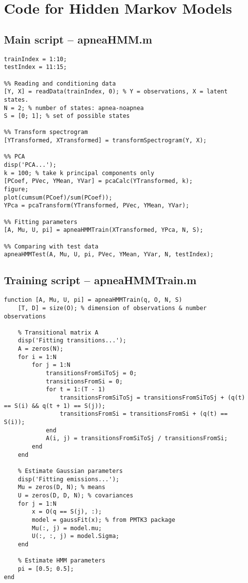 \chapter{Code for Hidden Markov Models}
\label{ch:HMMCode}

\section{Main script -- apneaHMM.m}
\label{sec:apneaHMM}
\begin{lstlisting}
trainIndex = 1:10;
testIndex = 11:15;

%% Reading and conditioning data
[Y, X] = readData(trainIndex, 0); % Y = observations, X = latent states.
N = 2; % number of states: apnea-noapnea
S = [0; 1]; % set of possible states

%% Transform spectrogram
[YTransformed, XTransformed] = transformSpectrogram(Y, X);

%% PCA
disp('PCA...');
k = 100; % take k principal components only
[PCoef, PVec, YMean, YVar] = pcaCalc(YTransformed, k);
figure;
plot(cumsum(PCoef)/sum(PCoef));
YPca = pcaTransform(YTransformed, PVec, YMean, YVar);

%% Fitting parameters
[A, Mu, U, pi] = apneaHMMTrain(XTransformed, YPca, N, S);

%% Comparing with test data
apneaHMMTest(A, Mu, U, pi, PVec, YMean, YVar, N, testIndex);
\end{lstlisting}

\section{Training script -- apneaHMMTrain.m}
\label{sec:apneaHMMTrain}
\begin{lstlisting}
function [A, Mu, U, pi] = apneaHMMTrain(q, O, N, S)
    [T, D] = size(O); % dimension of observations & number observations

    % Transitional matrix A
    disp('Fitting transitions...');
    A = zeros(N);
    for i = 1:N
        for j = 1:N
            transitionsFromSiToSj = 0;
            transitionsFromSi = 0;
            for t = 1:(T - 1)
                transitionsFromSiToSj = transitionsFromSiToSj + (q(t) == S(i) && q(t + 1) == S(j));
                transitionsFromSi = transitionsFromSi + (q(t) == S(i));
            end
            A(i, j) = transitionsFromSiToSj / transitionsFromSi;
        end
    end

    % Estimate Gaussian parameters
    disp('Fitting emissions...');
    Mu = zeros(D, N); % means
    U = zeros(D, D, N); % covariances
    for j = 1:N
        x = O(q == S(j), :);
        model = gaussFit(x); % from PMTK3 package
        Mu(:, j) = model.mu;
        U(:, :, j) = model.Sigma;
    end

    % Estimate HMM parameters
    pi = [0.5; 0.5];
end
\end{lstlisting}

